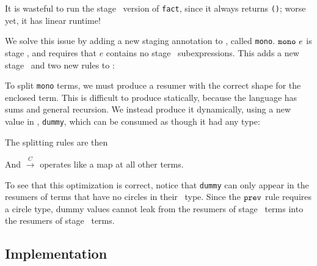 It is wasteful to run the stage \bbtwo\ version of \texttt{fact}, since it
always returns \texttt{()}; worse yet, it has linear runtime!

We solve this issue by adding a new staging annotation to \lang, called
\texttt{mono}. ${\tt mono}~e$ is stage \bbone, and requires that $e$ contains
no stage \bbtwo\ subexpressions. This adds a new stage \bbmono\ and two new
rules to \lang:


To split \texttt{mono} terms, we must produce a resumer with the correct shape
for the enclosed term. This is difficult to produce statically, because the
language has sums and general recursion. We instead produce it dynamically,
using a new value in \langmono, \texttt{dummy}, which can be consumed as though
it had any type:


The splitting rules are then
And $\overset{C}{\rightarrow}$ operates like a map at all other terms.

To see that this optimization is correct, notice that \texttt{dummy} can only
appear in the resumers of terms that have no circles in their \lang\ type.
Since the ${\tt prev}$ rule requires a circle type, dummy values cannot leak from the
resumers of stage \bbone\ terms into the resumers of stage \bbtwo\ terms.



\subsection{Implementation}


